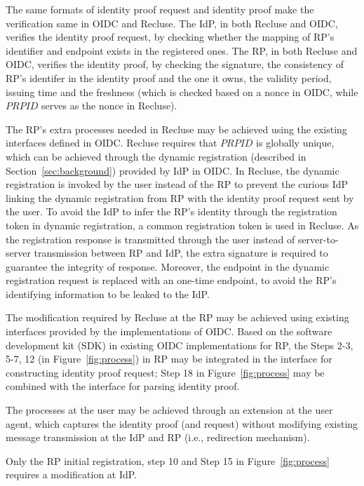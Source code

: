 The same formats of identity proof request and identity proof make the verification same in OIDC and Recluse. The IdP, in both Recluse and OIDC, verifies the identity proof request, by checking whether the mapping of RP's identifier and endpoint exists in the registered ones. The RP, in both Recluse and OIDC, verifies the identity proof, by checking the signature, the consistency of RP's identifer in the identity proof and the one it owns, the validity period, issuing time and the freshness (which is checked based on a nonce in  OIDC, while  $PRPID$ serves as the nonce in Recluse).

The RP's extra processes needed in Recluse may be achieved using the existing interfaces defined in OIDC.  
Recluse requires that $PRPID$ is globally unique, which can be achieved through the dynamic registration (described in Section~\ref{sec:background}) provided by IdP in OIDC. 
In Recluse, the dynamic registration is invoked by the user instead of the RP to prevent the curious IdP linking  the dynamic registration from RP with the identity proof request sent by the user.
To avoid the IdP to infer the RP's identity through the registration token in dynamic registration, 
a common  registration token is used in Recluse. 
As the registration response is transmitted through the user instead of server-to-server transmission between RP and IdP, the extra signature is required to guarantee the integrity of response. Moreover, the endpoint in the dynamic registration request is replaced with an one-time endpoint, to avoid the RP's identifying information to be leaked to the IdP.


The modification required by Recluse at the RP may be achieved using existing interfaces provided by the implementations of OIDC. 
Based on the software development kit (SDK) in existing OIDC implementations for RP, the Steps 2-3, 5-7, 12 (in Figure~\ref{fig:process}) in RP may be integrated in the interface for constructing identity proof request;
Step 18 in Figure~\ref{fig:process} may be combined with the interface for  parsing identity proof.

The processes at the user may be achieved through an extension at the user agent, 
which captures the identity proof (and request)  without modifying existing message transmission at the IdP and RP (i.e., redirection mechanism). %


Only the RP initial registration, step 10 and Step 15 in Figure~\ref{fig:process} requires a modification at IdP.

